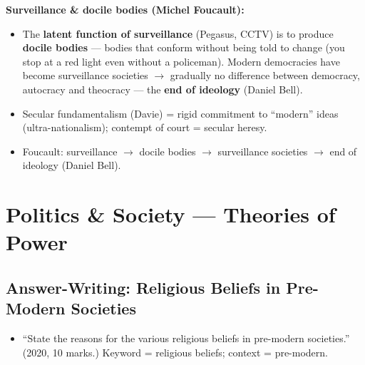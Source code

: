 \begin{CriticalPoint}
\textbf{Surveillance \& docile bodies (Michel Foucault):}
\begin{itemize}
\item The \textbf{latent function of surveillance} (Pegasus, CCTV) is to produce \textbf{docile bodies} --- bodies that conform without being told to change (you stop at a red light even without a policeman). Modern democracies have become surveillance societies $\rightarrow$ gradually no difference between democracy, autocracy and theocracy --- the \textbf{end of ideology} (Daniel Bell).
\end{itemize}
\end{CriticalPoint}

\begin{QuickRevision}
\begin{itemize}
\item Secular fundamentalism (Davie) = rigid commitment to ``modern'' ideas (ultra-nationalism); contempt of court = secular heresy.
\item Foucault: surveillance $\rightarrow$ docile bodies $\rightarrow$ surveillance societies $\rightarrow$ end of ideology (Daniel Bell).
\end{itemize}
\end{QuickRevision}

\sectiondivider

\section{Politics \& Society --- Theories of Power}

\subsection{Answer-Writing: Religious Beliefs in Pre-Modern Societies}

\begin{PYQLink}
\begin{itemize}
\item ``State the reasons for the various religious beliefs in pre-modern societies.'' (2020, 10 marks.) Keyword = religious beliefs; context = pre-modern.
\end{itemize}
\end{PYQLink}

